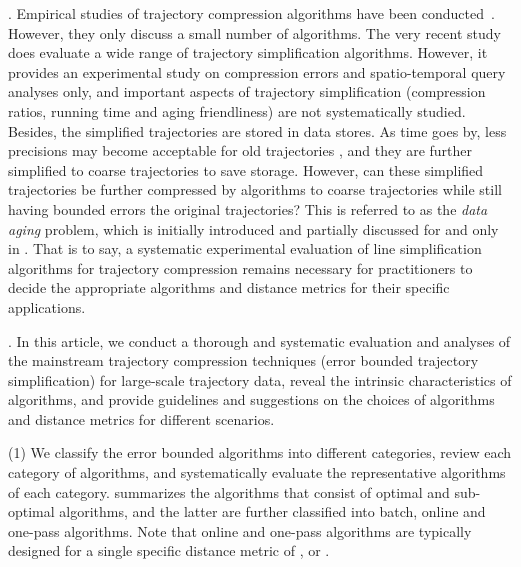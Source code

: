 . Empirical studies of trajectory compression algorithms have been conducted~\cite{Muckell:Compression,MuckellHLR10,mThesis}. However, they only discuss a small number of algorithms. The very recent study \cite{Zhang:Evaluation} does evaluate a wide range of trajectory simplification algorithms.
However, it provides {an experimental study} on compression errors and spatio-temporal query analyses only, and important aspects of trajectory simplification (compression ratios, running time and aging friendliness) are not systematically studied. Besides, the simplified trajectories are stored in data stores. As time goes by, less precisions may become acceptable for old trajectories \cite{Cao:Spatio}, and they are further simplified to coarse trajectories to save storage. However, can these simplified trajectories be further compressed by \lsa algorithms to coarse trajectories while still having bounded errors \wrt the original trajectories? This is referred to as the \emph{data aging} problem, which is initially introduced and partially discussed for \opt and \dpa only in \cite{Cao:Spatio}.
That is to say, a systematic experimental evaluation of line simplification algorithms for trajectory compression remains necessary for practitioners to decide the appropriate algorithms and distance metrics for their specific applications.





.
In this article, we conduct a thorough and systematic evaluation and analyses of the mainstream trajectory compression techniques (\ie error bounded trajectory simplification) for large-scale trajectory data, {reveal the intrinsic characteristics of algorithms, and provide guidelines and suggestions on the choices of algorithms and distance metrics for different scenarios.}

\stab (1) We classify the error bounded \lsa algorithms into different categories, review each category of algorithms, and systematically evaluate the representative algorithms of each category.
%
 summarizes the algorithms that consist of optimal and sub-optimal algorithms, and the latter are further classified into batch, online and one-pass algorithms.
Note that online and one-pass algorithms are typically designed for a single specific distance metric of \ped, \sed or \dad.

